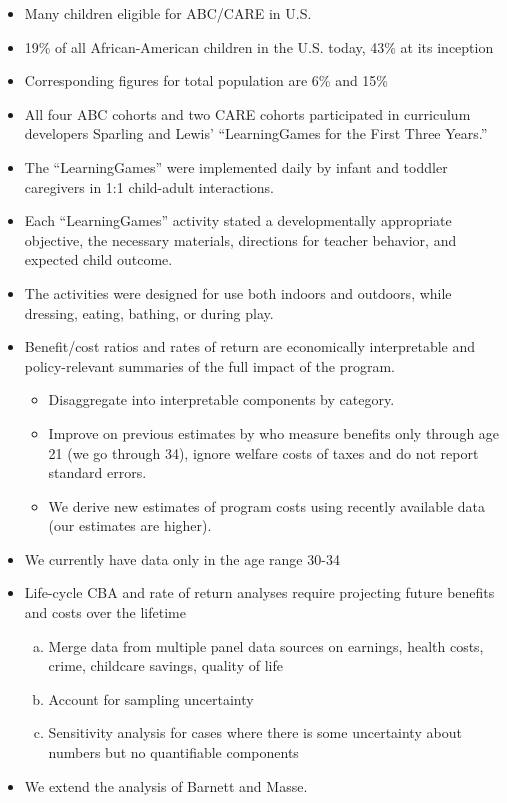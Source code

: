\documentclass[static]{JJH-Beamer}
\begin{document}
\begin{itemize}
\item Many children eligible for ABC/CARE in U.S.
\item 19\% of all African-American children in the U.S. today, 43\% at its inception
\item Corresponding figures for total population are 6\% and 15\%
\end{itemize}


\begin{itemize}
\item All four ABC cohorts and two CARE cohorts participated in curriculum developers Sparling and Lewis' ``LearningGames for the First Three Years.''
\item The ``LearningGames'' were implemented daily by infant and toddler caregivers in 1:1 child-adult interactions.
\item Each ``LearningGames'' activity stated a developmentally appropriate objective, the necessary materials, directions for teacher behavior, and expected child outcome.
\item The activities were designed for use both indoors and outdoors, while dressing, eating, bathing, or during play.
\item Benefit/cost ratios and rates of return are economically interpretable and policy-relevant summaries of the full impact of the program.
    \begin{itemize}
    \item Disaggregate into interpretable components by category.
    \item Improve on previous estimates by \citet{Barnett_Masse_2007_EER} who measure benefits only through age 21 (we go through 34), ignore welfare costs of taxes and do not report standard errors.
    \item We derive new estimates of program costs using recently available data (our estimates are higher).
    \end{itemize}
\item We currently have data only in the age range 30-34
\item Life-cycle CBA and rate of return analyses require projecting future benefits and costs over the lifetime
    \begin{enumerate}[(a)]
    \item Merge data from multiple panel data sources on earnings, health costs, crime, childcare savings, quality of life
    \item Account for sampling uncertainty
    \item Sensitivity analysis for cases where there is some uncertainty about numbers but no quantifiable components
    \end{enumerate}
\item We extend the analysis of Barnett and Masse.
\end{itemize}
\end{document}
